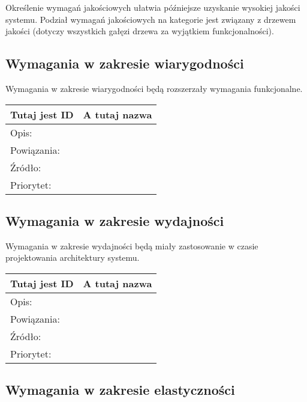 \documentclass[a4paper,10pt]{article}
\begin{document}
Określenie wymagań jakościowych ułatwia późniejsze uzyskanie wysokiej jakości systemu. Podział wymagań jakościowych na kategorie jest związany z drzewem jakości (dotyczy wszystkich gałęzi drzewa za wyjątkiem funkcjonalności).

\subsection{Wymagania w zakresie wiarygodności}

Wymagania w zakresie wiarygodności będą rozszerzały wymagania funkcjonalne. 

\begin{center}
\begin{tabular}{|l|l|} \hline

Tutaj jest ID & A tutaj nazwa \\ \hline
Opis: &  \\ \hline
Powiązania: &  \\ \hline
Źródło: &  \\ \hline
Priorytet: &  \\ \hline

\end{tabular}
\end{center}

\subsection{Wymagania w zakresie wydajności}

Wymagania w zakresie wydajności będą miały zastosowanie w czasie projektowania architektury systemu.

\begin{center}
\begin{tabular}{|l|l|} \hline

Tutaj jest ID & A tutaj nazwa \\ \hline
Opis: &  \\ \hline
Powiązania: &  \\ \hline
Źródło: &  \\ \hline
Priorytet: &  \\ \hline

\end{tabular}
\end{center}

\subsection{Wymagania w zakresie elastyczności}
\end{document}
